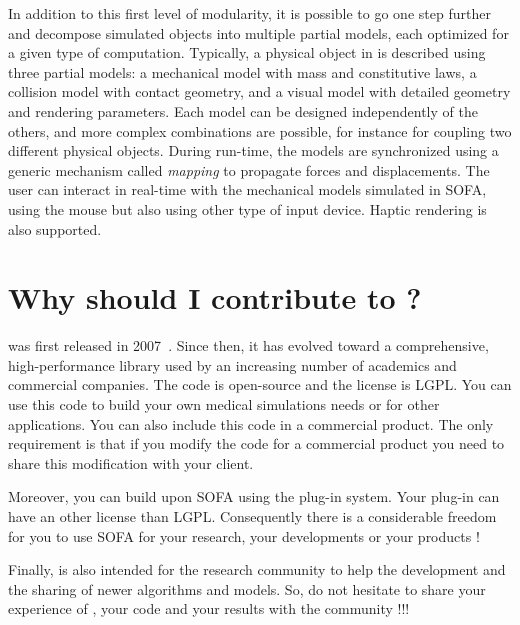 In addition to this first level of modularity, it is possible to go one step further and decompose simulated objects into multiple partial models, each optimized for a given type of computation.
Typically, a physical object in \sofa{} is described using three partial models: a mechanical model with mass and constitutive laws, a collision model with contact geometry, and a visual model with detailed geometry and rendering parameters.
Each model can be designed independently of the others, and more complex combinations are possible, for instance for coupling two different physical objects.
During run-time, the models are synchronized using a generic mechanism called \textit{mapping} to propagate forces and displacements. 
The user can interact in real-time with the mechanical models simulated in SOFA, using the mouse but also using other type of input device. Haptic rendering is also supported.

\section{Why should I contribute to \sofa ?}
\sofa{} was first released in 2007~\cite{ACFBPDDG07}. Since then, it has evolved toward a comprehensive, high-performance library used by an increasing number of academics and commercial companies.
The code is open-source and the license is LGPL. 
 You can use this code to build your own medical simulations needs or for other applications. You can also include this code in a commercial product. 
The only requirement is that if you modify the code for a commercial product you need to share this modification with your client.

Moreover, you can build upon SOFA using the plug-in system. Your plug-in can have an other license than LGPL. Consequently there is a considerable freedom for you to use SOFA for your research, your developments or your products !

Finally,  \sofa is also intended for the research community to help the development and the sharing of newer algorithms and models.
So, do not hesitate to share your experience of \sofa, your code and your results with the \sofa community !!!

